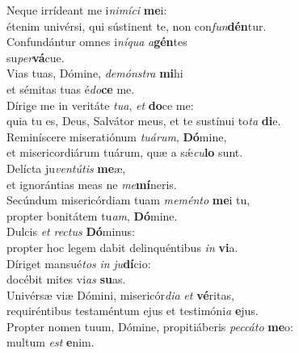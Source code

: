 \evenverse Neque irrídeant me i\textit{ni}\textit{mí}\textit{ci} \textbf{me}i:~\*\\
\evenverse étenim univérsi, qui sústinent te, non con\textit{fun}\textbf{dén}tur.\\
\oddverse Confundántur omnes i\textit{ní}\textit{qua} \textit{a}\textbf{gén}tes~\*\\
\oddverse su\textit{per}\textbf{vá}cue.\\
\evenverse Vias tuas, Dómine, \textit{de}\textit{món}\textit{stra} \textbf{mi}hi~\*\\
\evenverse et sémitas tuas é\textit{do}\textbf{ce} me.\\
\oddverse Dírige me in veritáte \textit{tu}\textit{a}, \textit{et} \textbf{do}ce me:~\*\\
\oddverse quia tu es, Deus, Salvátor meus, et te sustínui to\textit{ta} \textbf{di}e.\\
\evenverse Reminíscere miseratiónum \textit{tu}\textit{á}\textit{rum}, \textbf{Dó}mine,~\*\\
\evenverse et misericordiárum tuárum, quæ a sǽ\textit{cu}\textbf{lo} sunt.\\
\oddverse Delícta ju\textit{ven}\textit{tú}\textit{tis} \textbf{me}æ,~\*\\
\oddverse et ignorántias meas ne \textit{me}\textbf{mí}neris.\\
\evenverse Secúndum misericórdiam tuam \textit{me}\textit{mén}\textit{to} \textbf{me}i tu,~\*\\
\evenverse propter bonitátem tu\textit{am}, \textbf{Dó}mine.\\
\oddverse Dulcis \textit{et} \textit{re}\textit{ctus} \textbf{Dó}minus:~\*\\
\oddverse propter hoc legem dabit delinquéntibus \textit{in} \textbf{vi}a.\\
\evenverse Díriget mansué\textit{tos} \textit{in} \textit{ju}\textbf{dí}cio:~\*\\
\evenverse docébit mites vi\textit{as} \textbf{su}as.\\
\oddverse Univérsæ viæ Dómini, misericór\textit{di}\textit{a} \textit{et} \textbf{vé}ritas,~\*\\
\oddverse requiréntibus testaméntum ejus et testimóni\textit{a} \textbf{e}jus.\\
\evenverse Propter nomen tuum, Dómine, propitiáberis \textit{pec}\textit{cá}\textit{to} \textbf{me}o:~\*\\
\evenverse multum \textit{est} \textbf{e}nim.\\
